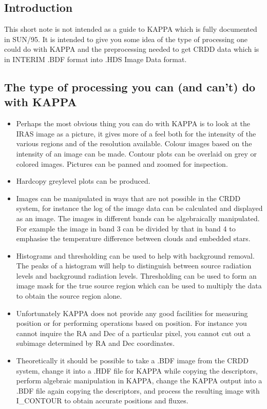 \subsection{Introduction}

This short note is not intended as a guide to KAPPA which is fully documented
in SUN/95. It is intended to give you some idea of the type of processing one
could do with KAPPA and the preprocessing needed to get CRDD data which is in
INTERIM .BDF format into .HDS Image Data format.

\subsection{The type of processing you can (and can't) do with KAPPA}

\begin{itemize}
\item Perhaps the most obvious thing you can do with KAPPA is to look at the
IRAS image as a picture, it gives more of a feel both for the intensity of the
various regions and of the resolution available. Colour images based on the
intensity of an image can be made. Contour plots can be overlaid on grey or
colored images. Pictures can be panned and zoomed for inspection.
\item Hardcopy greylevel plots can be produced.
\item Images can be manipulated in ways that are not possible in the CRDD
system, for instance the log of the image data can be calculated and displayed
as an image. The images in different bands can be algebraically manipulated. For
example the image in band 3 can be divided by that in band 4 to emphasise the
temperature difference between clouds and embedded stars.
\item Histograms and thresholding can be used to help with background removal.
The peaks of a histogram will help to distinguish between source radiation
levels and background radiation levels. Thresholding can be used to form an
image mask for the true source region which can be used to multiply the data to
obtain the source region alone.
\item Unfortunately KAPPA does not provide any good facilities for measuring
position or for performing operations based on position. For instance you
cannot inquire the RA and Dec of a particular pixel, you cannot cut out a
subimage determined by RA and Dec coordinates. 
\item Theoretically it should be possible to take a .BDF image from the CRDD
system, change it into a .HDF file for KAPPA while copying the descriptors,
perform algebraic manipulation in KAPPA, change the KAPPA output into a .BDF
file again copying the descriptors, and process the resulting image with
I\_CONTOUR to obtain accurate positions and fluxes.
\end{itemize}

